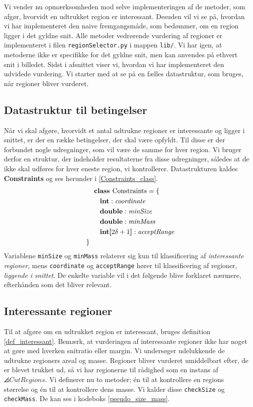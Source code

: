 {
{\sffamily Vi vender nu opmærksomheden mod selve implementeringen af de
metoder, som afgør, hvorvidt en udtrukket region er interessant.
Desuden vil vi se på, hvordan vi har implementeret den naive
fremgangsmåde, som bedømmer, om en region ligger i det gyldne snit. Alle
metoder vedrørende vurdering af regioner er implementeret i filen
\texttt{regionSelector.py} i mappen \texttt{lib/}.  Vi har igen, at
metoderne ikke er specifikke for det gyldne snit, men kan anvendes på
ethvert snit i billedet. Sidst i afsnittet viser vi, hvordan vi har
implementeret den udvidede vurdering.  Vi starter med at se på en fælles
datastruktur, som bruges, når regioner bliver vurderet.
}

\subsection{Datastruktur til betingelser}
Når vi skal afgøre, hvorvidt et antal udtrukne regioner er interessante
og ligger i snittet, er der en række betingelser, der skal være opfyldt.
Til disse er der forbundet nogle udregninger, som vil være de samme for
hver region. Vi bruger derfor en struktur, der indeholder resultaterne
fra disse udregninger, således at de ikke skal udføres for hver eneste
region, vi kontrollerer. Datastrukturen kaldes \textbf{Constraints} og
ses herunder i \eqref{Constraints_class}.
\begin{multline}
    \textbf{class~} \textrm{Constraints} = \{ \\
    \shoveleft{\qquad\textbf{int} : \textit{coordinate}} \\
    \shoveleft{\qquad\textbf{double} : \textit{minSize}} \\
    \shoveleft{\qquad\textbf{double} : \textit{minMass}} \\
    \shoveleft{\qquad\textbf{int[}2\delta + 1\textbf{]} : \textit{acceptRange}} \\
    \shoveleft{\}}\shoveright{}
    \label{Constraints_class}
\end{multline}
Variablene \texttt{minSize} og \texttt{minMass} relaterer sig kun til
klassificering af \emph{interessante regioner}, mens \texttt{coordinate}
og \texttt{acceptRange} hører til klassificering af regioner,
\emph{liggende i snittet}. De enkelte variable vil i det følgende blive
forklaret nærmere, efterhånden som det bliver relevant.

\subsection{Interessante regioner}
Til at afgøre om en udtrukket region er interessant, bruges definition
\ref{def_interessant}. Bemærk, at vurderingen af interessante regioner
ikke har noget at gøre med hverken snitratio eller margin. Vi undersøger
udelukkende de udtrukne regioners areal og masse. Regioner bliver
vurderet umiddelbart efter, de er blevet trukket ud, så vi har
regionerne til rådighed som en instans af $\angles{CutRegions}$. Vi
definerer nu to metoder; én til at kontrollere en regions størrelse og
én til at kontrollere dens masse. Vi kalder disse \texttt{checkSize} og
\texttt{checkMass}. De kan ses i kodeboks \ref{pseudo_size_mass}.

}

